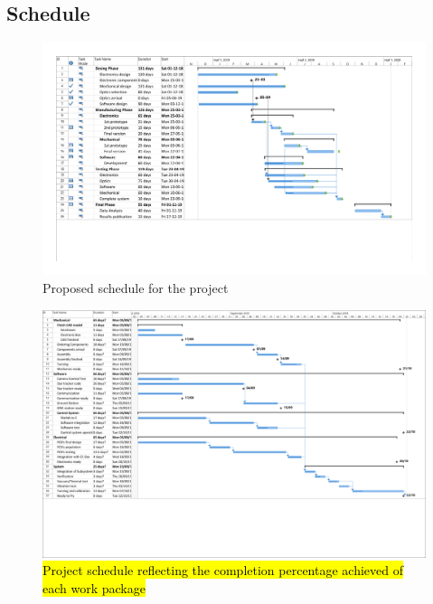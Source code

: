 \begin{landscape}

\subsection{Schedule}
\begin{figure}[H]

\includegraphics[scale=0.65]{3-project-planning/img/Gantt1_15072019.pdf}
\caption{Proposed schedule for the project}
\label{GanttChart}
\end{figure}

\begin{figure}[H]
	\centering
	\includegraphics[scale=0.5]{3-project-planning/img/Gantt_2_Comp.pdf}
	\caption{\hl{Project schedule reflecting the completion percentage achieved of each work package}}
	\label{Grantt2}
\end{figure}
\end{landscape}
